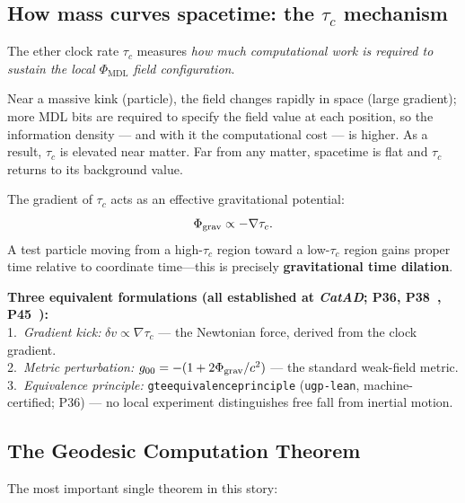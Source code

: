 \documentclass[11pt,a4paper]{article}
\newcommand{\term}[1]{\textbf{#1}}
\newcommand{\lean}[1]{\begingroup\def\_{\textunderscore\allowbreak}\texttt{#1}\endgroup}
\newcommand{\PHIMDL}{\Phi_{\mathrm{MDL}}}
\begin{document}
\subsection{How mass curves spacetime: the \texorpdfstring{$\tau_c$}{tau\_c} mechanism}

The ether clock rate $\tau_c$ measures \emph{how much computational work is required
to sustain the local $\PHIMDL$ field configuration}.

Near a massive kink (particle), the field changes rapidly in space (large gradient);
more MDL bits are required to specify the field value at each position, so the
information density --- and with it the computational cost --- is higher.
As a result, $\tau_c$ is elevated near matter.
Far from any matter, spacetime is flat and $\tau_c$ returns to its background value.

The gradient of $\tau_c$ acts as an effective gravitational potential:
\[
  \Phi_{\rm grav} \propto -\nabla\tau_c.
\]
A test particle moving from a high-$\tau_c$ region toward a low-$\tau_c$ region
gains proper time relative to coordinate time---this is precisely \term{gravitational
time dilation}.

\begin{tcolorbox}[colback=boxgray,colframe=gray!50!black]
\textbf{Three equivalent formulations (all established at \textit{CatAD}; P36, P38~\cite{SpivackPhiMDLGravity}, P45~\cite{SpivackThreeTapeCMCA}):}\\[4pt]
1.\ \textit{Gradient kick:} $\delta v \propto \nabla\tau_c$ --- the Newtonian
    force, derived from the clock gradient.\\[2pt]
2.\ \textit{Metric perturbation:} $g_{00} = -(1 + 2\Phi_{\rm grav}/c^2)$ ---
    the standard weak-field metric.\\[2pt]
3.\ \textit{Equivalence principle:}
    \lean{gte\_equivalence\_principle} (\texttt{ugp-lean}, machine-certified; P36) ---
    no local experiment distinguishes free fall from inertial motion.
\end{tcolorbox}

\subsection{The Geodesic Computation Theorem}

The most important single theorem in this story:
\end{document}
